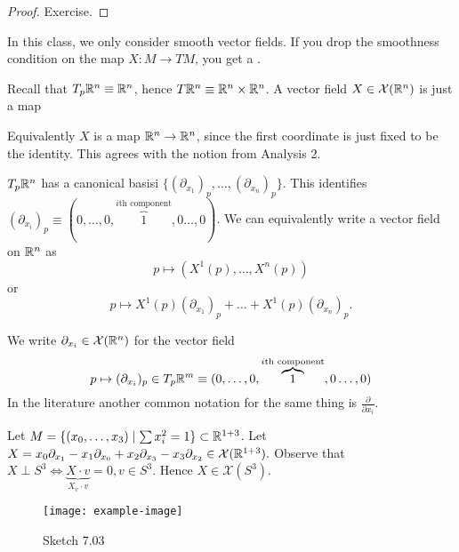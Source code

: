\begin{proof}
    Exercise.
\end{proof}

\begin{remark}
    In this class, we only consider smooth vector fields. If you drop the smoothness condition on the map \(X:M\to TM\),
    you get a . 
\end{remark}

\begin{example}
    Recall that \(T_p\mathbb{R}^n\equiv \mathbb{R}^n\), hence \(T\mathbb{R}^n\equiv \mathbb{R}^n\times \mathbb{R}^n\).
    A vector field \(X\in\mathcal{X}(\mathbb{R}^n)\) is just a map  
    \begin{center}
    \end{center}
    Equivalently \(X\) is a map \(\mathbb{R}^n\to\mathbb{R}^n\), since the first coordinate is just fixed to be the 
    identity. This agrees with the notion from Analysis 2. 
\end{example}

\begin{remark}
    \(T_p\mathbb{R}^n\) has a canonical basisi \(\{(\partial_{x_1})_p,\dots,(\partial_{x_n})_p\}\). This identifies 
    \((\partial_{x_i})_p\equiv (0,\dots,0,\overbrace{1}^{i\text{th component}},0\dots,0)\). We can equivalently 
    write a vector field on \(\mathbb{R}^n\) as \[p\mapsto (X^1(p),\dots,X^n(p))\]
    or 
    \[p\mapsto X^1(p)(\partial_{x_1})_p+\dots+X^1(p)(\partial_{x_n})_p.\]
\end{remark}

 We write \(\partial_{x_i}\in\mathcal{X}(\mathbb{R}^n)\) for the vector field 
\[p \mapsto (\partial_{x_i})_p\in T_p\mathbb{R}^m\equiv (0,\dots,0,\overbrace{1}^{i\text{th component}},0\dots,0)\]
In the literature another common notation for the same thing is \(\frac{\partial}{\partial x_i}\).

\begin{example}
    Let \(M=\{(x_0,\dots,x_3)\mid \sum x_i^2=1\}\subset\mathbb{R}^{1+3}\). Let \(X=x_0\partial_{x_1}-x_1\partial_{x_0}+x_2\partial_{x_3}-x_3\partial_{x_2}\in \mathcal{X}(\mathbb{R}^{1+3}).\)
    Observe that \(X\perp S^3 \iff \underbrace{X\cdot v}_{X_v\cdot v} = 0, v\in S^3.\) Hence \(X \in \mathcal{X}(S^3)\).
    \begin{figure}[H]\label{fig:03}
        \centering
        \texttt{[image: example-image]}
        \caption{Sketch 7.03}
    \end{figure}
\end{example}

